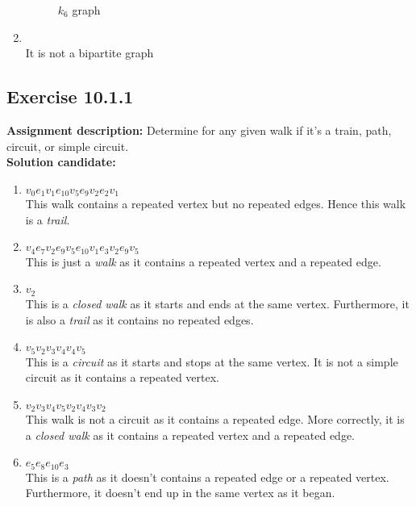 \documentclass{report}
\newcommand{\AssignmentDescription}{\textbf{Assignment description: }}
\newcommand{\Solution}{\textbf{Solution candidate: }}
\newcommand{\Exercise}[1]{\subsection{Exercise #1}}
\newcommand{\defaultEnumerateLabel}{\textbf{\alph*.}}
\newcommand{\emptyItem}{\item \,\\}
\newcommand{\MyItem}[1]{\item #1\\}
\begin{document}
\begin{enumerate}[label=\defaultEnumerateLabel]
\begin{figure}[H]
			\caption{$k_6$ graph}
		\end{figure}
		
		\emptyItem
		
		It is not a bipartite graph
	\end{enumerate}
	
	\Exercise{10.1.1}
	
	\AssignmentDescription
	Determine for any given walk if it's a train, path, circuit, or simple circuit.\\
	
	\Solution
	
	\begin{enumerate}[label=\defaultEnumerateLabel]
		\item $v_0 e_1 v_1e_{10} v_5 e_9 v_2 e_2 v_1$\\
		
		This walk contains a repeated vertex but no repeated edges. Hence this walk is a \textit{trail}.
		
		\MyItem{$v_4 e_7 v_2 e_9 v_5 e_{10} v_1 e_3 v_2 e_9 v_5$}
		
		This is just a \textit{walk} as it contains a repeated vertex and a repeated edge. 
		
		\MyItem{$v_2$}
		
		This is a \textit{closed walk} as it starts and ends at the same vertex. Furthermore, it is also a \textit{trail} as it contains no repeated edges.
		
		\MyItem{$v_5 v_2 v_3 v_4 v_4 v_5$}
		
		This is a \textit{circuit} as it starts and stops at the same vertex. It is not a simple circuit as it contains a repeated vertex.
		
		\MyItem{$v_2 v_3 v_4 v_5 v_2 v_4 v_3 v_2$}
		
		This walk is not a circuit as it contains a repeated edge. More correctly, it is a \textit{closed walk} as it contains a repeated vertex and a repeated edge.
		
		\MyItem{$e_5 e_8 e_{10} e_3$}
		
		This is a \textit{path} as it doesn't contains a repeated edge or a repeated vertex. Furthermore, it doesn't end up in the same vertex as it began.
		
		
	\end{enumerate}
	
\end{document}
